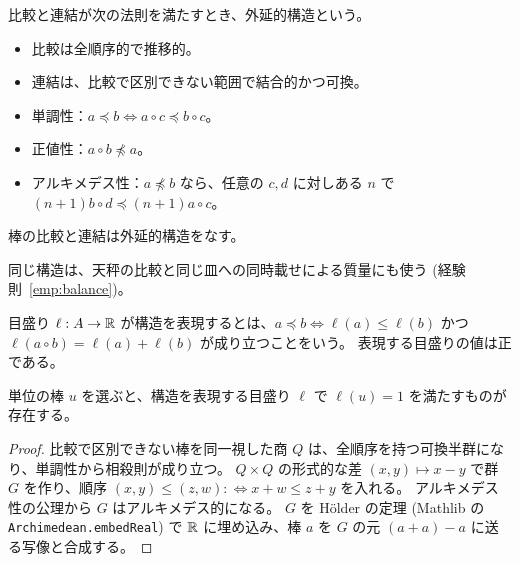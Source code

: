 \begin{definition}[外延的構造]
  \label{def:extensive}
  \leanok
  比較と連結が次の法則を満たすとき、外延的構造という。
  \begin{itemize}
    \item 比較は全順序的で推移的。
    \item 連結は、比較で区別できない範囲で結合的かつ可換。
    \item 単調性：$a \preceq b \iff a \circ c \preceq b \circ c$。
    \item 正値性：$a \circ b \not\preceq a$。
    \item アルキメデス性：$a \not\preceq b$ なら、任意の $c, d$ に対しある $n$ で $(n+1) b \circ d \preceq (n+1) a \circ c$。
  \end{itemize}
\end{definition}

\begin{empirical}[棒の比較と連結]
  \label{emp:rods}
  \leanok
  棒の比較と連結は外延的構造をなす。
\end{empirical}

同じ構造は、天秤の比較と同じ皿への同時載せによる質量にも使う (経験則~\ref{emp:balance})。

\begin{definition}[表現]
  \label{def:represents}
  \leanok
  目盛り $\ell : A \to \mathbb{R}$ が構造を表現するとは、$a \preceq b \iff \ell(a) \le \ell(b)$ かつ $\ell(a \circ b) = \ell(a) + \ell(b)$ が成り立つことをいう。
  表現する目盛りの値は正である。
\end{definition}

\begin{theorem}[目盛りの存在]
  \label{thm:length-exists}
  \leanok
  単位の棒 $u$ を選ぶと、構造を表現する目盛り $\ell$ で $\ell(u) = 1$ を満たすものが存在する。
\end{theorem}

\begin{proof}
  \leanok
  比較で区別できない棒を同一視した商 $Q$ は、全順序を持つ可換半群になり、単調性から相殺則が成り立つ。
  $Q \times Q$ の形式的な差 $(x, y) \mapsto x - y$ で群 $G$ を作り、順序 $(x,y) \le (z,w) :\iff x + w \le z + y$ を入れる。
  アルキメデス性の公理から $G$ はアルキメデス的になる。
  $G$ を Hölder の定理 (Mathlib の \texttt{Archimedean.embedReal}) で $\mathbb{R}$ に埋め込み、棒 $a$ を $G$ の元 $(a + a) - a$ に送る写像と合成する。
\end{proof}

